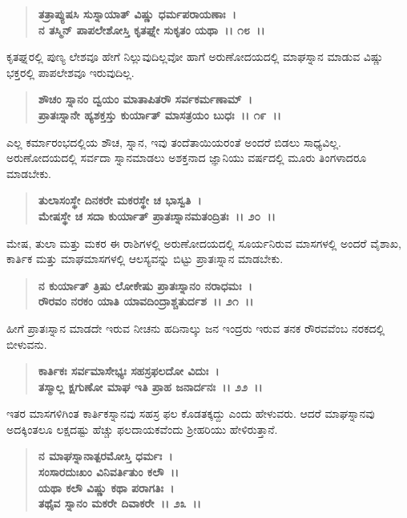 \begin{verse}
\textbf{ತತ್ರಾಪ್ಯುಷಸಿ ಸುಸ್ನಾಯಾತ್ ವಿಷ್ಣು ಧರ್ಮಪರಾಯಣಾಃ~।}\\\textbf{ನ ತಸ್ಮಿನ್ ಪಾಪಲೇಶೋಸ್ತಿ ಕೃತಘ್ನೇ ಸುಕೃತಂ ಯಥಾ~।। ೧೮~।।}
\end{verse}

ಕೃತಘ್ನರಲ್ಲಿ ಪುಣ್ಯ ಲೇಶವೂ ಹೇಗೆ ನಿಲ್ಲುವುದಿಲ್ಲವೋ ಹಾಗೆ ಅರುಣೋದಯದಲ್ಲಿ ಮಾಘಸ್ನಾನ ಮಾಡುವ ವಿಷ್ಣು ಭಕ್ತರಲ್ಲಿ ಪಾಪಲೇಶವೂ ಇರುವುದಿಲ್ಲ.

\begin{verse}
\textbf{ಶೌಚಂ ಸ್ನಾನಂ ದ್ವಯಂ ಮಾತಾಪಿತರೌ ಸರ್ವಕರ್ಮಣಾಮ್~।}\\\textbf{ಪ್ರಾತಃಸ್ನಾನೇ ಹ್ಯಶಕ್ತಸ್ತು ಕುರ್ಯಾತ್ ಮಾಸತ್ರಯಂ ಬುಧಃ~।। ೧೯~।।}
\end{verse}

ಎಲ್ಲ ಕರ್ಮಾರಂಭದಲ್ಲಿಯ ಶೌಚ, ಸ್ನಾನ, ಇವು ತಂದೆತಾಯಿಯರಂತೆ ಅಂದರೆ ಬಿಡಲು ಸಾಧ್ಯವಿಲ್ಲ. ಅರುಣೋದಯದಲ್ಲಿ ಸರ್ವದಾ ಸ್ನಾನಮಾಡಲು ಅಶಕ್ತನಾದ ಜ್ಞಾನಿಯು ವರ್ಷದಲ್ಲಿ ಮೂರು ತಿಂಗಳಾದರೂ ಮಾಡಬೇಕು.

\begin{verse}
\textbf{ತುಲಾಸಂಸ್ಥೇ ದಿನಕರೇ ಮಕರಸ್ಥೇ ಚ ಭಾಸ್ವತಿ~।}\\\textbf{ಮೇಷಸ್ಥೇ ಚ ಸದಾ ಕುರ್ಯಾತ್ ಪ್ರಾತಃಸ್ನಾನಮತಂದ್ರಿತಃ~।। ೨೦~।।}
\end{verse}

ಮೇಷ, ತುಲಾ ಮತ್ತು ಮಕರ ಈ ರಾಶಿಗಳಲ್ಲಿ ಅರುಣೋದಯದಲ್ಲಿ ಸೂರ್ಯನಿರುವ ಮಾಸಗಳಲ್ಲಿ ಅಂದರೆ ವೈಶಾಖ, ಕಾರ್ತಿಕ ಮತ್ತು ಮಾಘಮಾಸಗಳಲ್ಲಿ ಆಲಸ್ಯವನ್ನು ಬಿಟ್ಟು ಪ್ರಾತಃಸ್ನಾನ ಮಾಡಬೇಕು.

\begin{verse}
\textbf{ನ ಕುರ್ಯಾತ್ ತ್ರಿಷು ಲೋಕೇಷು ಪ್ರಾತಃಸ್ನಾನಂ ನರಾಧಮಃ~।}\\\textbf{ರೌರವಂ ನರಕಂ ಯಾತಿ ಯಾವದಿಂದ್ರಾಶ್ಚತುರ್ದಶ~।। ೨೧~।।}
\end{verse}

ಹೀಗೆ ಪ್ರಾತಃಸ್ನಾನ ಮಾಡದೇ ಇರುವ ನೀಚನು ಹದಿನಾಲ್ಕು ಜನ ಇಂದ್ರರು ಇರುವ ತನಕ ರೌರವವೆಂಬ ನರಕದಲ್ಲಿ ಬೀಳುವನು.

\begin{verse}
\textbf{ಕಾರ್ತಿಕಃ ಸರ್ವಮಾಸೇಭ್ಯಃ ಸಹಸ್ರಫಲದೋ ವಿದುಃ~।}\\\textbf{ತಸ್ಮಾಲ್ಲ ಕ್ಷಗುಣೋ ಮಾಘ ಇತಿ ಪ್ರಾಹ ಜನಾರ್ದನಃ~।। ೨೨~।।}
\end{verse}

ಇತರ ಮಾಸಗಳಿಗಿಂತ ಕಾರ್ತಿಕಸ್ನಾನವು ಸಹಸ್ರ ಫಲ ಕೊಡತಕ್ಕದ್ದು ಎಂದು ಹೇಳುವರು. ಆದರೆ ಮಾಘಸ್ನಾನವು ಅದಕ್ಕಿಂತಲೂ ಲಕ್ಷದಷ್ಟು ಹೆಚ್ಚು ಫಲದಾಯಕವೆಂದು ಶ‍್ರೀಹರಿಯು ಹೇಳಿರುತ್ತಾನೆ.

\begin{verse}
\textbf{ನ ಮಾಘಸ್ನಾನಾತ್ಪರಮೋಸ್ತಿ ಧರ್ಮಃ~।}\\\textbf{ಸಂಸಾರದುಃಖಂ ವಿನಿವರ್ತಿತುಂ ಕಲೌ~।।}\\\textbf{ಯಥಾ ಕಲೌ ವಿಷ್ಣು ಕಥಾ ಪರಾಗತಿಃ~।}\\\textbf{ತಥೈವ ಸ್ನಾನಂ ಮಕರೇ ದಿವಾಕರೇ~।। ೨೩~।।}
\end{verse}


